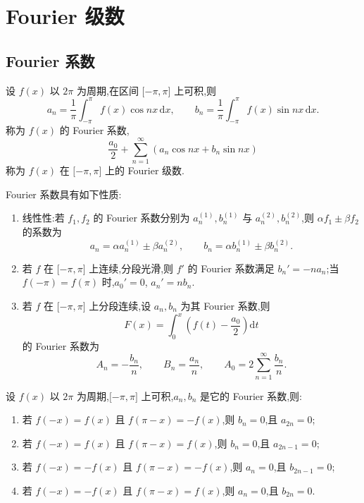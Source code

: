 \newpage

\section{Fourier 级数}


\subsection{Fourier 系数}

设 $f(x)$ 以 $2\pi$ 为周期,在区间 $\lbrack -\pi,\pi\rbrack$ 上可积,则
\[
    a_n=\dfrac{1}{\pi}\int_{-\pi}^{\pi}f(x)\cos nx\,\mathrm{d}x,
    \qquad
    b_n=\dfrac{1}{\pi}\int_{-\pi}^{\pi}f(x)\sin nx\,\mathrm{d}x.
\]
称为 $f(x)$ 的 Fourier 系数,
\[
    \dfrac{a_0}{2}+\sum\limits_{n=1}^{\infty}(a_n\cos nx+b_n\sin nx)
\]
称为 $f(x)$ 在 $\lbrack -\pi,\pi\rbrack$ 上的 Fourier 级数.

\begin{proposition}[\markstar]
    Fourier 系数具有如下性质:
    \begin{enumerate}
        \item 线性性:若 $f_1,f_2$ 的 Fourier 系数分别为 $a_n^{(1)},b_n^{(1)}$ 与 $a_n^{(2)},b_n^{(2)}$,则 $\alpha f_1\pm\beta f_2$ 的系数为
              \[
                  a_n=\alpha a_n^{(1)}\pm\beta a_n^{(2)},
                  \qquad
                  b_n=\alpha b_n^{(1)}\pm\beta b_n^{(2)}.
              \]
        \item 若 $f$ 在 $\lbrack -\pi,\pi\rbrack$ 上连续,分段光滑,则 $f'$ 的 Fourier 系数满足 $b_n'=-na_n$;当 $f(-\pi)=f(\pi)$ 时,$a_0'=0$, $a_n'=nb_n$.
        \item 若 $f$ 在 $\lbrack -\pi,\pi\rbrack$ 上分段连续,设 $a_n,b_n$ 为其 Fourier 系数,则
              \[
                  F(x)=\int_0^x\left(f(t)-\dfrac{a_0}{2}\right)\mathrm{d}t
              \]
              的 Fourier 系数为
              \[
                  A_n=-\dfrac{b_n}{n},
                  \qquad
                  B_n=\dfrac{a_n}{n},
                  \qquad
                  A_0=2\sum\limits_{n=1}^{\infty}\dfrac{b_n}{n}.
              \]
    \end{enumerate}
\end{proposition}

\begin{proposition}[\markstar]
    设 $f(x)$ 以 $2\pi$ 为周期,$\lbrack -\pi,\pi\rbrack$ 上可积,$a_n,b_n$ 是它的 Fourier 系数,则:
    \begin{enumerate}
        \item 若 $f(-x)=f(x)$ 且 $f(\pi-x)=-f(x)$,则 $b_n=0$,且 $a_{2n}=0$;
        \item 若 $f(-x)=f(x)$ 且 $f(\pi-x)=f(x)$,则 $b_n=0$,且 $a_{2n-1}=0$;
        \item 若 $f(-x)=-f(x)$ 且 $f(\pi-x)=-f(x)$,则 $a_n=0$,且 $b_{2n-1}=0$;
        \item 若 $f(-x)=-f(x)$ 且 $f(\pi-x)=f(x)$,则 $a_n=0$,且 $b_{2n}=0$.
    \end{enumerate}
\end{proposition}

